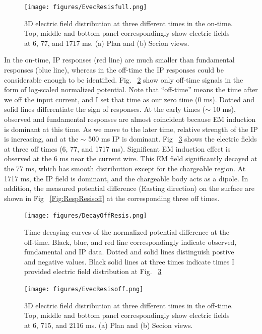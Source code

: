 \documentclass[letterpaper,11pt]{article}
\begin{document}
\begin{figure}[htb]
  \centering
  \texttt{[image: figures/EvecResisfull.png]}
  \caption{3D electric field distribution at three different times in the on-time. Top, middle and bottom panel correspondingly show electric fields at 6, 77, and 1717 ms. (a) Plan and (b) Secion views. }
  \label{Fig:EvecResisfull}
\end{figure}

In the on-time, IP responses (red line) are much smaller than fundamental responses (blue line), whereas in the off-time the IP responses could be considerable enough to be identified. Fig. ~\ref{Fig:DecayOffResis} show only off-time signals in the form of log-scaled normalized potential. Note that ``off-time'' means the time after we off the input current, and I set that time as our zero time (0 ms). Dotted and solid lines differentiate the sign of responses. At the early times ($\sim$ 10 ms), observed and fundamental responses are almost coincident because EM induction is dominant at this time. As we move to the later time, relative strength of the IP is increasing, and at the $\sim$ 500 ms IP is dominant. Fig ~\ref{Fig:EvecResisoff} shows the electric fields at three off times (6, 77, and 1717 ms). Significant EM induction effect is observed at the 6 ms near the current wire. This EM field significantly decayed at the 77 ms, which has smooth distribution except for the chargeable region. At 1717 ms, the IP field is dominant, and the chargeable body acts as a dipole. 
In addition, the measured potential difference (Easting direction) on the surface are shown in Fig ~\ref{Fig:RespResisoff} at the corresponding three off times. 

\begin{figure}[htb]
  \centering
  \texttt{[image: figures/DecayOffResis.png]}
  \caption{Time decaying curves of the normalized potential difference at the off-time. Black, blue, and red line correspondingly indicate observed, fundamental and IP data. Dotted and solid lines distinguish postive and negative values. Black solid lines at three times indicate times I provided electric field distribution at Fig. ~\ref{Fig:EvecResisoff}}
  \label{Fig:DecayOffResis}
\end{figure}

\begin{figure}[htb]
  \centering
  \texttt{[image: figures/EvecResisoff.png]}
  \caption{3D electric field distribution at three different times in the off-time. Top, middle and bottom panel correspondingly show electric fields at 6, 715, and 2116 ms. (a) Plan and (b) Secion views.}
  \label{Fig:EvecResisoff}
\end{figure}
\end{document}
